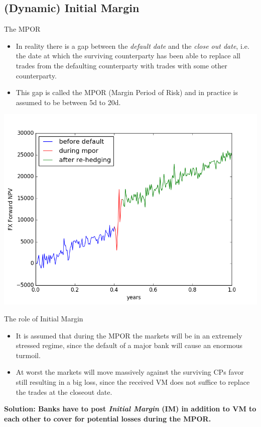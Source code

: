 \documentclass[t]{beamer}
\begin{document}
\subsection{(Dynamic) Initial Margin}

\begin{frame}{The MPOR}
	\begin{itemize}
		\item
			In reality there is a gap between the \emph{default date} and the \emph{close out date}, i.e. the date at which the surviving counterparty has been able to replace all trades from the defaulting counterparty with trades with some other counterparty.
		\item
			This gap is called the MPOR (Margin Period of Risk) and in practice is assumed to be between 5d to 20d.	
	\end{itemize}
	\vspace{-1em}
	\begin{center}
		\includegraphics[scale=0.35]{pics/mpor_gap.png}
	\end{center}
\end{frame}

\begin{frame}{The role of Initial Margin}
	\begin{itemize}
		\item
			It is assumed that during the MPOR the markets will be in an extremely stressed regime, since the default of a major bank will cause an enormous turmoil. 
		\item
			At worst the markets will move massively against the surviving CPs favor still resulting in a big loss, since the received VM does not suffice to replace the trades at the closeout date.
	\end{itemize}
	\begin{center}
		\textbf{Solution: Banks have to post \emph{Initial Margin} (IM) in addition to VM to each other to cover for potential losses during the MPOR.}
	\end{center}
\end{frame}
\end{document}
